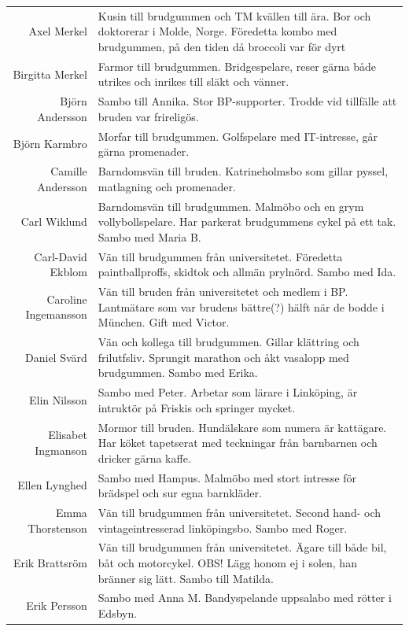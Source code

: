 \documentclass[a5paper]{article}
\begin{document}
\begin{longtable}[l]{N|L}
				Axel Merkel	&	Kusin till brudgummen och TM kvällen till ära. Bor och doktorerar i Molde, Norge. Föredetta kombo med brudgummen, på den tiden då broccoli var för dyrt 	\\
				Birgitta Merkel	&	Farmor till brudgummen. Bridgespelare, reser gärna både utrikes och inrikes till släkt och vänner. 	\\
				Björn Andersson	&	Sambo till Annika. Stor BP-supporter. Trodde vid tillfälle att bruden var frireligös.	\\
				Björn Karmbro	&	Morfar till brudgummen. Golfspelare med IT-intresse, går gärna promenader.  	\\
				Camille Andersson	&	Barndomsvän till bruden. Katrineholmsbo som gillar pyssel, matlagning och promenader.	\\
				Carl Wiklund	&	Barndomsvän till brudgummen. Malmöbo och en grym vollybollspelare. Har parkerat brudgummens cykel på ett tak. Sambo med Maria B.	\\
				Carl-David Ekblom	&	Vän till brudgummen från universitetet. Föredetta paintballproffs, skidtok och allmän prylnörd. Sambo med Ida.	\\
				Caroline Ingemansson &	Vän till bruden från universitetet och medlem i BP. Lantmätare som var brudens bättre(?) hälft när de bodde i München. Gift med Victor.	\\
				Daniel Svärd	&	Vän och kollega till brudgummen. Gillar klättring och frilutfsliv. Sprungit marathon och åkt vasalopp med brudgummen.  Sambo med Erika.	\\
				Elin Nilsson	&	Sambo med Peter. Arbetar som lärare i Linköping, är intruktör på Friskis och springer mycket.	\\
				Elisabet Ingmanson	&	Mormor till bruden. Hundälskare som numera är kattägare. Har köket tapetserat med teckningar från barnbarnen och dricker gärna kaffe.	\\
				Ellen Lynghed	&	Sambo med Hampus. Malmöbo med stort intresse för brädspel och sur egna barnkläder.	\\
				Emma Thorstenson	&	Vän till brudgummen från universitetet. Second hand- och vintageintresserad linköpingsbo. Sambo med Roger.	\\
				Erik Brattsröm	&	Vän till brudgummen från universitetet. Ägare till både bil, båt och motorcykel. OBS! Lägg honom ej i solen, han bränner sig lätt. Sambo till Matilda.	\\
				Erik Persson	&	Sambo med Anna M. Bandyspelande uppsalabo med rötter i Edsbyn. 	\\

\end{longtable}
\end{document}
